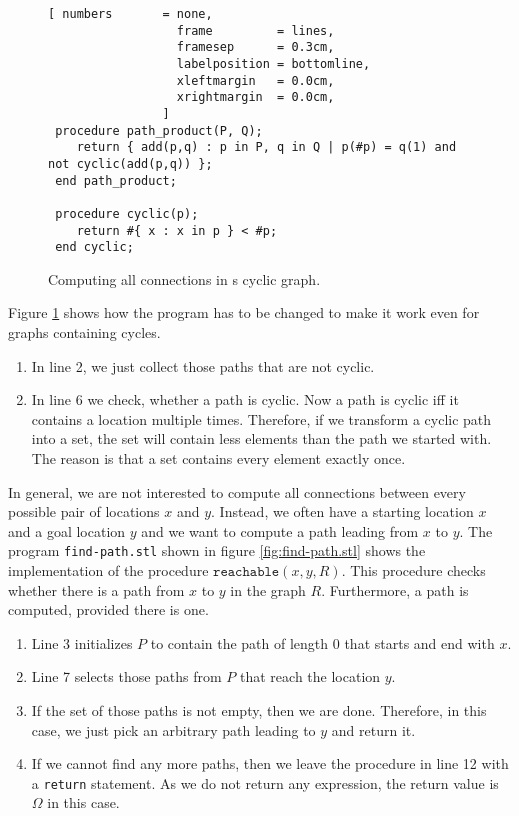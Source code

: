 \begin{figure}[!ht]
  \centering
\begin{Verbatim}[ numbers       = none,
                  frame         = lines, 
                  framesep      = 0.3cm, 
                  labelposition = bottomline,
                  xleftmargin   = 0.0cm,
                  xrightmargin  = 0.0cm,
                ]
 procedure path_product(P, Q);
    return { add(p,q) : p in P, q in Q | p(#p) = q(1) and not cyclic(add(p,q)) };
 end path_product;    

 procedure cyclic(p);
    return #{ x : x in p } < #p;
 end cyclic;
\end{Verbatim} 
\vspace*{-0.3cm}
\caption{Computing all connections in s cyclic graph.}  
\label{fig:path-cyclic.stl}
\end{figure} %

Figure \ref{fig:path-cyclic.stl} shows how the program has to be changed to make it work even for
graphs containing cycles. 
\begin{enumerate}
\item In line 2, we just collect those paths that are not cyclic.
\item In line 6 we check, whether a path is cyclic.  Now a path is cyclic iff it contains a
      location multiple times.  Therefore, if we transform a cyclic path into a set, the set
      will contain less elements than the path we started with.  The reason is that a set contains
      every element exactly once.
\end{enumerate}
In general, we are not interested to compute all connections between every possible pair of
locations $x$ and $y$.  Instead, we often have a starting location $x$ and a goal location $y$ and
we want to compute a path leading from $x$ to $y$.
The program \texttt{find-path.stl} shown in figure \ref{fig:find-path.stl} shows the implementation
of the procedure  $\texttt{reachable}(x, y, R)$.  This procedure checks whether there is a
path from $x$ to $y$ in the graph $R$.  Furthermore, a path is computed, provided there is
one. 
\begin{enumerate}
\item Line 3 initializes $P$ to contain the path of length 0 that starts and end with $x$.
\item Line 7 selects those paths from  $P$ that reach the location $y$.
\item If the set of those paths is not empty, then we are done.
      Therefore, in this case, we just pick an arbitrary path leading to $y$ and return it.
\item If we cannot find any more paths, then we leave the procedure in line 12 with a \texttt{return}
      statement.  As we do not return any expression, the return value is $\Omega$ in this case.
\end{enumerate}

